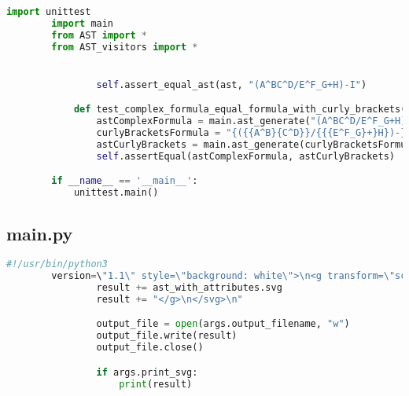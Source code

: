     \begin{lstlisting}[language=Python]
        import unittest
        import main
        from AST import *
        from AST_visitors import *


                self.assert_equal_ast(ast, "(A^BC^D/E^F_G+H)-I")

            def test_complex_formula_equal_formula_with_curly_brackets(self):
                astComplexFormula = main.ast_generate("(A^BC^D/E^F_G+H)-I")
                curlyBracketsFormula = "{({{A^B}{C^D}}/{{{E^F_G}+}H})-}I"
                astCurlyBrackets = main.ast_generate(curlyBracketsFormula)
                self.assertEqual(astComplexFormula, astCurlyBrackets)

        if __name__ == '__main__':
            unittest.main()

    \end{lstlisting}


    \subsection{main.py}

        \begin{lstlisting}[language=Python]
            #!/usr/bin/python3
        version=\"1.1\" style=\"background: white\">\n<g transform=\"scale(40) translate(1,1)\" font-family=\"Courier\">\n".format(ast_with_attributes.a*50+80, (ast_with_attributes.h1+ast_with_attributes.h2)*40+80, ast_with_attributes.h1)
                result += ast_with_attributes.svg
                result += "</g>\n</svg>\n"

                output_file = open(args.output_filename, "w")
                output_file.write(result)
                output_file.close()

                if args.print_svg:
                    print(result)

        \end{lstlisting}
